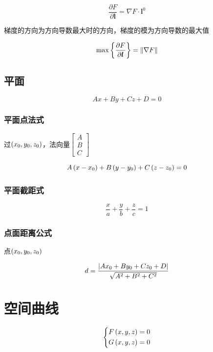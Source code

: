 \documentclass{article}
\begin{document}
\[\frac{\partial F}{\partial\boldsymbol l}=\nabla F\cdot\boldsymbol l^0\]

梯度的方向为方向导数最大时的方向，梯度的模为方向导数的最大值

\[\max\left\{\frac{\partial F}{\partial\boldsymbol l}\right\}=\left\Vert\nabla F\right\Vert\]

\subsection{平面}

\begin{definition}[]
    \[Ax+By+Cz+D=0\]
\end{definition}

\subsubsection{平面点法式}

过$\left(x_0,y_0,z_0\right)$，法向量$\begin{bmatrix}A\\B\\C\end{bmatrix}$

\[A\left(x-x_0\right)+
    B\left(y-y_0\right)+
    C\left(z-z_0\right)=0\]

\subsubsection{平面截距式}

\[\frac xa+\frac yb+\frac zc=1\]

\subsubsection{点面距离公式}

点$\left(x_0,y_0,z_0\right)$

\[d=\frac{\left|Ax_0+By_0+Cz_0+D\right|}{\sqrt{A^2+B^2+C^2}}\]

\section{空间曲线}

\begin{definition}[]
    \[\left\{\begin{aligned}
            F\left(x,y,z\right) & =0 \\
            G\left(x,y,z\right) & =0
        \end{aligned}\right.\]
\end{definition}
\end{document}
